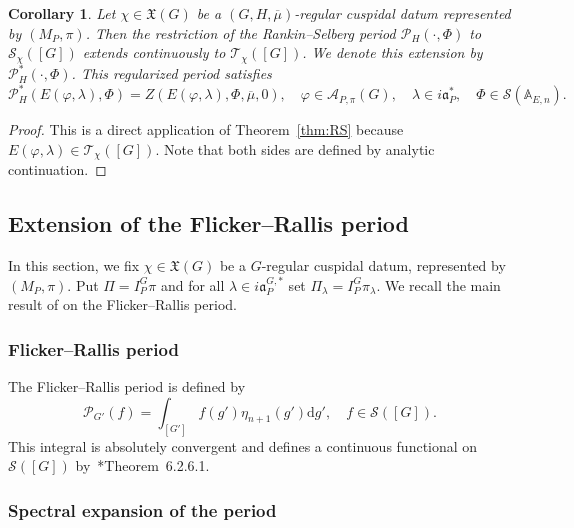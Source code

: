 \documentclass[letterpaper,11pt]{amsart}
\newcommand{\fa}{\mathfrak{a}}
\newcommand{\fX}{\mathfrak{X}}
\newcommand{\bA}{\mathbb{A}}
\newcommand{\cA}{\mathcal{A}}
\newcommand{\cP}{\mathcal{P}}
\newcommand{\cS}{\mathcal{S}}
\newcommand{\cT}{\mathcal{T}}
\newcommand{\rd}{\mathrm{d}}
\newcommand{\<}{\negthickspace}
\theoremstyle{definition}
\theoremstyle{plain}
\newtheorem{coro}[definition]{Corollary}
\theoremstyle{remark}
\numberwithin{equation}{section}
\begin{document}
\begin{coro}
    \label{cor:RS_extension_Eisenstein}
    Let $\chi \in \fX(G)$ be a $(G,H,\overline{\mu})$-regular cuspidal datum represented by $(M_P,\pi)$. Then the restriction of the Rankin--Selberg period $\cP_{H}(\cdot, \Phi)$ to $\cS_{\chi}([G])$ extends continuously to $\cT_{\chi}([G])$. We denote this extension by $\cP_{H}^*( \cdot ,\Phi)$. This regularized period satisfies
    \begin{equation*}
        \cP_H^*(E(\varphi,\lambda),\Phi)=Z(E(\varphi,\lambda),\Phi,\overline{\mu},0), \quad \varphi \in \cA_{P,\pi}(G), \quad \lambda \in i \fa_P^*, \quad \Phi \in \cS(\bA_{E,n}).
    \end{equation*}
\end{coro}

\begin{proof}
    This is a direct application of Theorem~\ref{thm:RS} because $E(\varphi,\lambda) \in \cT_\chi([G])$. Note that both sides are defined by analytic continuation.
\end{proof}

\subsection{Extension of the Flicker--Rallis period}

In this section, we fix $\chi \in \mathfrak{X}(G)$ be a $G$-regular cuspidal datum, represented by
$(M_P,\pi)$. Put $\Pi = I_{P}^{G} \pi$ and for all $\lambda \in i
\mathfrak{a}_{P}^{G,*}$ set $\Pi_\lambda = I_{P}^{G} \pi_\lambda$. We recall the main result of \cite{BPC22} on the Flicker--Rallis period.


\subsubsection{Flicker--Rallis period} The Flicker--Rallis period is defined by 
    \begin{equation}    \label{eq:FR_period}
    \cP_{G'}(f) = \int_{[G']} f(g') \eta_{n+1}(g') \rd g', \quad f \in \cS([G]).
    \end{equation}
This integral is absolutely convergent and defines a continuous functional on
$\cS([G])$ by~\cite{BPCZ}*{Theorem~6.2.6.1}. 

\subsubsection{Spectral expansion of the period}
\end{document}
